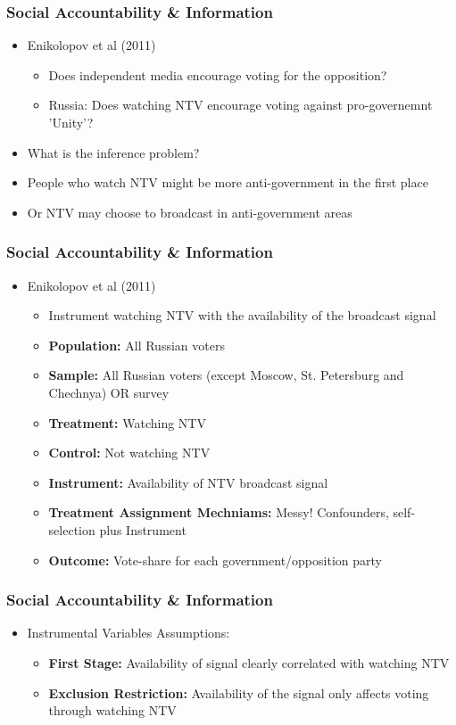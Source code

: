 \documentclass[xcolor=x11names,compress]{beamer}\usepackage[]{graphicx}\usepackage[]{color}
\renewcommand{\(}{\begin{columns}}
\renewcommand{\)}{\end{columns}}
\newcommand{\<}[1]{\begin{column}{#1}}
\renewcommand{\>}{\end{column}}
\begin{document}
\begin{frame}
\frametitle{Social Accountability \& Information}
\begin{itemize}
\item Enikolopov et al (2011)
\begin{itemize}
\item Does independent media encourage voting for the opposition?
\pause
\item Russia: Does watching NTV encourage voting against pro-governemnt 'Unity'?
\pause
\end{itemize}
\item What is the inference problem?
\pause
\item People who watch NTV might be more anti-government in the first place
\item Or NTV may choose to broadcast in anti-government areas
\end{itemize}
\end{frame}

\begin{frame}
\frametitle{Social Accountability \& Information}
\begin{itemize}
\item Enikolopov et al (2011)
\begin{itemize}
\item Instrument watching NTV with the availability of the broadcast signal
\pause
\item \textbf{Population:} \pause All Russian voters
\pause
\item \textbf{Sample:} \pause All Russian voters (except Moscow, St. Petersburg and Chechnya) OR survey
\pause
\item \textbf{Treatment:} \pause Watching NTV
\pause
\item \textbf{Control:} \pause Not watching NTV
\pause
\item \textbf{Instrument:} \pause Availability of NTV broadcast signal
\pause
\item \textbf{Treatment Assignment Mechniams:} \pause Messy! Confounders, self-selection plus Instrument
\pause
\item \textbf{Outcome:} \pause Vote-share for each government/opposition party
\end{itemize}
\end{itemize}
\end{frame}

\begin{frame}
\frametitle{Social Accountability \& Information}
\begin{itemize}
\item Instrumental Variables Assumptions:
\begin{itemize}
\item \textbf{First Stage:} \pause Availability of signal clearly correlated with watching NTV
\pause
\item \textbf{Exclusion Restriction:} \pause Availability of the signal only affects voting through watching NTV
\end{itemize}
\end{itemize}
\end{frame}
\end{document}
